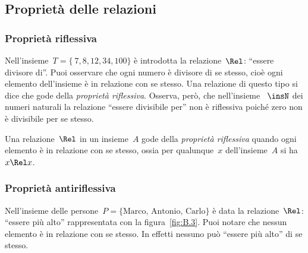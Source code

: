 \subsection{Proprietà delle relazioni}
\label{subsec:rel_proprieta}

\subsubsection{Proprietà riflessiva}

\begin{exrig}
 \begin{esempio}

Nell'insieme~$T = \lbrace~7, 8, 12, 34, 100 \rbrace$ è introdotta la 
relazione~$\Rel$: ``essere divisore di''.
Puoi osservare che ogni numero è divisore di se stesso, cioè ogni elemento 
dell'insieme è in relazione
con se stesso. Una relazione di questo tipo si dice che gode della 
\emph{proprietà riflessiva}.
Osserva, però, che nell'insieme ~$\insN$ dei numeri naturali la relazione 
``essere divisibile per'' non è riflessiva poiché zero non è divisibile per se 
stesso.
 \end{esempio}
\end{exrig}

\begin{definizione}
Una relazione~$\Rel$ in un insieme~$A$ gode della \emph{proprietà riflessiva} 
quando ogni elemento è in relazione con se stesso, ossia per qualunque~$x$
dell'insieme~$A$ si ha~$x \Rel x$.
\end{definizione}


\subsubsection{Proprietà antiriflessiva}

\begin{exrig}
 \begin{esempio}
Nell'insieme delle persone~$P = \lbrace\text{Marco, Antonio, Carlo}\rbrace$ è 
data la relazione~$\Rel$: ``essere più alto''
rappresentata con la figura~\ref{fig:B.3}.
Puoi notare che nessun elemento è in relazione con se stesso. In effetti nessuno 
può ``essere più alto'' di se stesso.

 \end{esempio}
\end{exrig}

